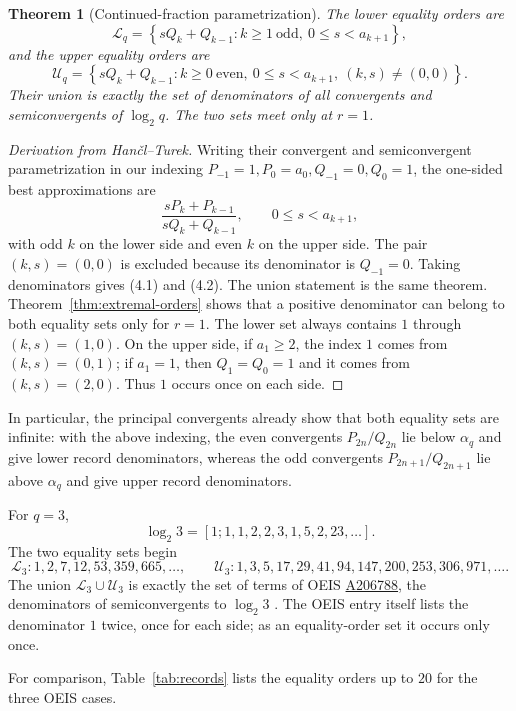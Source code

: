 \documentclass[11pt]{article}
\newtheorem{theorem}{Theorem}
\newcommand{\OEIS}[1]{\href{https://oeis.org/#1}{#1}}
\newcommand{\Lq}{\mathcal L}
\newcommand{\Uq}{\mathcal U}
\begin{document}
\begin{theorem}[Continued-fraction parametrization]
\label{thm:cf}
The lower equality orders are
\[
 \Lq_q=
 \left\{
 sQ_k+Q_{k-1}:
 k\geq1\ \text{odd},\
 0\leq s<a_{k+1}
 \right\},
 \tag{4.1}
\]
and the upper equality orders are
\[
 \Uq_q=
 \left\{
 sQ_k+Q_{k-1}:
 k\geq0\ \text{even},\
 0\leq s<a_{k+1},\
 (k,s)\neq(0,0)
 \right\}.
 \tag{4.2}
\]
Their union is exactly the set of denominators of all convergents and
semiconvergents of \(\log_2q\). The two sets meet only at \(r=1\).
\end{theorem}

\begin{proof}[Derivation from Han\v{c}l--Turek]
Writing their convergent and semiconvergent parametrization in our indexing
\(P_{-1}=1,P_0=a_0,Q_{-1}=0,Q_0=1\), the one-sided best approximations are
\[
 \frac{sP_k+P_{k-1}}{sQ_k+Q_{k-1}},
 \qquad 0\leq s<a_{k+1},
\]
with odd \(k\) on the lower side and even \(k\) on the upper side. The
pair \((k,s)=(0,0)\) is excluded because its denominator is
\(Q_{-1}=0\). Taking denominators gives (4.1) and (4.2). The union statement
is the same theorem. Theorem~\ref{thm:extremal-orders} shows that a positive
denominator can belong to both equality sets only for \(r=1\). The lower
set always contains \(1\) through \((k,s)=(1,0)\). On the upper side, if
\(a_1\geq2\), the index \(1\) comes from \((k,s)=(0,1)\); if
\(a_1=1\), then \(Q_1=Q_0=1\) and it comes from \((k,s)=(2,0)\).
Thus \(1\) occurs once on each side.
\end{proof}

In particular, the principal convergents already show that both equality
sets are infinite: with the above indexing, the even convergents
\(P_{2n}/Q_{2n}\) lie below \(\alpha_q\) and give lower record
denominators, whereas the odd convergents \(P_{2n+1}/Q_{2n+1}\) lie
above \(\alpha_q\) and give upper record denominators.

For \(q=3\),
\[
 \log_2 3=[1;1,1,2,2,3,1,5,2,23,\ldots].
\]
The two equality sets begin
\[
 \Lq_3:1,2,7,12,53,359,665,\ldots,
 \qquad
 \Uq_3:1,3,5,17,29,41,94,147,200,253,306,971,\ldots.
\]
The union \(\Lq_3\cup\Uq_3\) is exactly the set of terms of OEIS
\OEIS{A206788}, the denominators of semiconvergents to \(\log_2 3\)
\cite{OEIS206788}. The OEIS entry itself lists the denominator \(1\)
twice, once for each side; as an equality-order set it occurs only once.

For comparison, Table~\ref{tab:records} lists the equality orders up to
\(20\) for the three OEIS cases.
\end{document}
